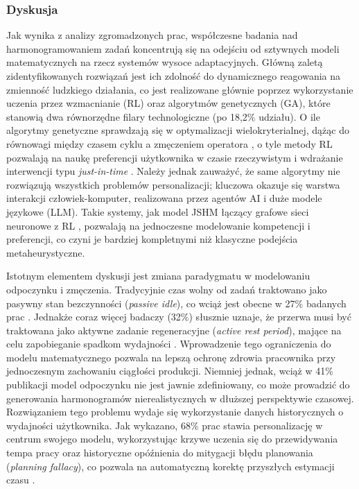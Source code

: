 \subsubsection{Dyskusja}

\quad Jak wynika z analizy zgromadzonych prac, współczesne badania nad harmonogramowaniem zadań koncentrują się na odejściu od sztywnych modeli matematycznych na rzecz systemów wysoce adaptacyjnych. Główną zaletą zidentyfikowanych rozwiązań jest ich zdolność do dynamicznego reagowania na zmienność ludzkiego działania, co jest realizowane głównie poprzez wykorzystanie uczenia przez wzmacnianie (RL) oraz algorytmów genetycznych (GA), które stanowią dwa równorzędne filary technologiczne (po 18,2\% udziału). O ile algorytmy genetyczne sprawdzają się w optymalizacji wielokryterialnej, dążąc do równowagi między czasem cyklu a zmęczeniem operatora \cite{dualTask2023}, o tyle metody RL pozwalają na naukę preferencji użytkownika w czasie rzeczywistym i wdrażanie interwencji typu \textit{just-in-time} \cite{inTimeRL2021}. Należy jednak zauważyć, że same algorytmy nie rozwiązują wszystkich problemów personalizacji; kluczowa okazuje się warstwa interakcji człowiek-komputer, realizowana przez agentów AI i duże modele językowe (LLM). Takie systemy, jak model JSHM łączący grafowe sieci neuronowe z RL \cite{JSHM2026}, pozwalają na jednoczesne modelowanie kompetencji i preferencji, co czyni je bardziej kompletnymi niż klasyczne podejścia metaheurystyczne.

\indent Istotnym elementem dyskusji jest zmiana paradygmatu w modelowaniu odpoczynku i zmęczenia. Tradycyjnie czas wolny od zadań traktowano jako pasywny stan bezczynności (\textit{passive idle}), co wciąż jest obecne w 27\% badanych prac \cite{HRC2020}. Jednakże coraz więcej badaczy (32\%) słusznie uznaje, że przerwa musi być traktowana jako aktywne zadanie regeneracyjne (\textit{active rest period}), mające na celu zapobieganie spadkom wydajności \cite{fatigue2025}. Wprowadzenie tego ograniczenia do modelu matematycznego pozwala na lepszą ochronę zdrowia pracownika przy jednoczesnym zachowaniu ciągłości produkcji. Niemniej jednak, wciąż w 41\% publikacji model odpoczynku nie jest jawnie zdefiniowany, co może prowadzić do generowania harmonogramów nierealistycznych w dłuższej perspektywie czasowej. Rozwiązaniem tego problemu wydaje się wykorzystanie danych historycznych o wydajności użytkownika. Jak wykazano, 68\% prac stawia personalizację w centrum swojego modelu, wykorzystując krzywe uczenia się do przewidywania tempa pracy \cite{competenceTimeQuality2020} oraz historyczne opóźnienia do mitygacji błędu planowania (\textit{planning fallacy}), co pozwala na automatyczną korektę przyszłych estymacji czasu \cite{gap2024}.


